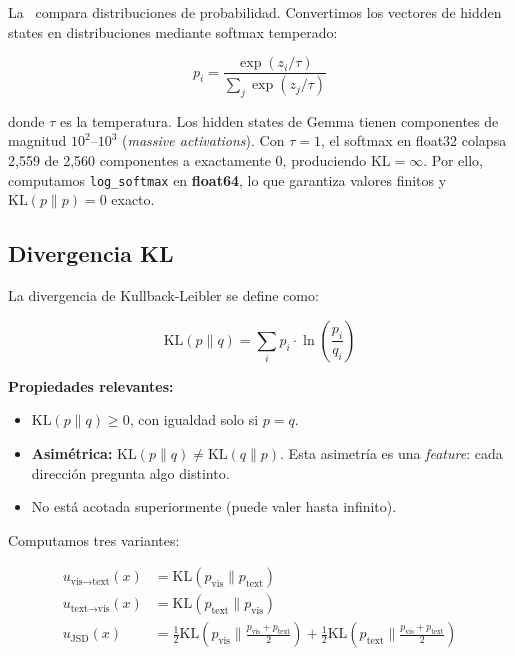 \documentclass[12pt,a4paper]{article}
\newcommand{\KL}{\mathrm{KL}}
\begin{document}
La \KL\ compara distribuciones de probabilidad.
Convertimos los vectores de hidden states en distribuciones mediante softmax temperado:

\begin{equation}
p_i = \frac{\exp(z_i / \tau)}{\sum_j \exp(z_j / \tau)}
\end{equation}

donde $\tau$ es la temperatura.
Los hidden states de Gemma tienen componentes de magnitud $10^2$--$10^3$ (\textit{massive activations}).
Con $\tau = 1$, el softmax en float32 colapsa 2,559 de 2,560 componentes a exactamente 0, produciendo $\KL = \infty$.
Por ello, computamos \texttt{log\_softmax} en \textbf{float64}, lo que garantiza valores finitos y $\KL(p \| p) = 0$ exacto.

\subsection{Divergencia KL}

La divergencia de Kullback-Leibler se define como:

\begin{equation}
\KL(p \| q) = \sum_i p_i \cdot \ln\left(\frac{p_i}{q_i}\right)
\end{equation}

\textbf{Propiedades relevantes:}

\begin{itemize}
    \item $\KL(p \| q) \geq 0$, con igualdad solo si $p = q$.
    \item \textbf{Asimétrica:} $\KL(p \| q) \neq \KL(q \| p)$.
    Esta asimetría es una \textit{feature}: cada dirección pregunta algo distinto.
    \item No está acotada superiormente (puede valer hasta infinito).
\end{itemize}

Computamos tres variantes:

\begin{align}
u_{\text{vis}\rightarrow\text{text}}(x) &= \KL(p_{\text{vis}} \| p_{\text{text}}) \\
u_{\text{text}\rightarrow\text{vis}}(x) &= \KL(p_{\text{text}} \| p_{\text{vis}}) \\
u_{\text{JSD}}(x) &= \frac{1}{2}\KL\left(p_{\text{vis}} \Big\| \frac{p_{\text{vis}} + p_{\text{text}}}{2}\right) + \frac{1}{2}\KL\left(p_{\text{text}} \Big\| \frac{p_{\text{vis}} + p_{\text{text}}}{2}\right)
\end{align}
\end{document}
